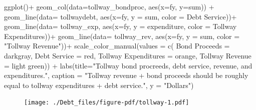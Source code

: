\documentclass[
  letterpaper,
  DIV=11,
  numbers=noendperiod]{scrreport}
\newenvironment{Shaded}{\begin{snugshade}}{\end{snugshade}}
\newcommand{\AttributeTok}[1]{\textcolor[rgb]{0.40,0.45,0.13}{#1}}
\newcommand{\FunctionTok}[1]{\textcolor[rgb]{0.28,0.35,0.67}{#1}}
\newcommand{\NormalTok}[1]{\textcolor[rgb]{0.00,0.23,0.31}{#1}}
\newcommand{\OtherTok}[1]{\textcolor[rgb]{0.00,0.23,0.31}{#1}}
\newcommand{\SpecialCharTok}[1]{\textcolor[rgb]{0.37,0.37,0.37}{#1}}
\newcommand{\StringTok}[1]{\textcolor[rgb]{0.13,0.47,0.30}{#1}}
\begin{document}
\begin{Shaded}
\begin{Highlighting}[]
\FunctionTok{ggplot}\NormalTok{()}\SpecialCharTok{+}
  \FunctionTok{geom\_col}\NormalTok{(}\AttributeTok{data=}\NormalTok{tollway\_bondproc, }\FunctionTok{aes}\NormalTok{(}\AttributeTok{x=}\NormalTok{fy, }\AttributeTok{y=}\NormalTok{sum)) }\SpecialCharTok{+}
  \FunctionTok{geom\_line}\NormalTok{(}\AttributeTok{data=}\NormalTok{ tollwaydebt, }\FunctionTok{aes}\NormalTok{(}\AttributeTok{x=}\NormalTok{fy, }\AttributeTok{y =}\NormalTok{ sum, }\AttributeTok{color =} \StringTok{\textquotesingle{}Debt Service\textquotesingle{}}\NormalTok{))}\SpecialCharTok{+} 
  \FunctionTok{geom\_line}\NormalTok{(}\AttributeTok{data=}\NormalTok{ tollway\_exp, }\FunctionTok{aes}\NormalTok{(}\AttributeTok{x=}\NormalTok{fy, }\AttributeTok{y =}\NormalTok{ expenditure, }\AttributeTok{color =} \StringTok{\textquotesingle{}Tollway Expenditures\textquotesingle{}}\NormalTok{))}\SpecialCharTok{+} 
  \FunctionTok{geom\_line}\NormalTok{(}\AttributeTok{data=}\NormalTok{ tollway\_rev, }\FunctionTok{aes}\NormalTok{(}\AttributeTok{x=}\NormalTok{fy, }\AttributeTok{y =}\NormalTok{ sum, }\AttributeTok{color =} \StringTok{"Tollway Revenue"}\NormalTok{))}\SpecialCharTok{+} 
  \FunctionTok{scale\_color\_manual}\NormalTok{(}\AttributeTok{values =} \FunctionTok{c}\NormalTok{(}
    \StringTok{\textquotesingle{}Bond Proceeds\textquotesingle{}} \OtherTok{=} \StringTok{\textquotesingle{}darkgray\textquotesingle{}}\NormalTok{,}
    \StringTok{\textquotesingle{}Debt Service\textquotesingle{}} \OtherTok{=} \StringTok{\textquotesingle{}red\textquotesingle{}}\NormalTok{,}
    \StringTok{\textquotesingle{}Tollway Expenditures\textquotesingle{}} \OtherTok{=} \StringTok{\textquotesingle{}orange\textquotesingle{}}\NormalTok{,}
    \StringTok{\textquotesingle{}Tollway Revenue\textquotesingle{}} \OtherTok{=} \StringTok{\textquotesingle{}light green\textquotesingle{}}\NormalTok{)) }\SpecialCharTok{+}
  \FunctionTok{labs}\NormalTok{(}\AttributeTok{title=}\StringTok{"Tollway bond procreeds, debt service, revenue, and expenditures."}\NormalTok{, }
       \AttributeTok{caption =} \StringTok{"Tollway revenue + bond proceeds should be roughly equal to tollway expenditures + debt service."}\NormalTok{, }
       \AttributeTok{y =} \StringTok{"Dollars"}\NormalTok{)}
\end{Highlighting}
\end{Shaded}

\begin{figure}[H]

{\centering \texttt{[image: ./Debt\_files/figure-pdf/tollway-1.pdf]}

}

\end{figure}
\end{document}
